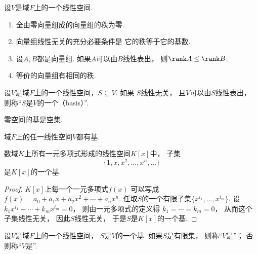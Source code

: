 \begin{property}
设\(V\)是域\(F\)上的一个线性空间.
\begin{enumerate}
	\item 全由零向量组成的向量组的秩为零.

	\item 向量组线性无关的充分必要条件是
	它的秩等于它的基数.

	\item 设\(A,B\)都是向量组.
	如果\(A\)可以由\(B\)线性表出，
	则\(\rank A \leq \rank B\).

	\item 等价的向量组有相同的秩.
\end{enumerate}
\end{property}

\begin{definition}
设\(V\)是域\(F\)上的一个线性空间，\(S \subseteq V\).
如果
\(S\)线性无关，
且\(V\)可以由\(S\)线性表出，
则称“\(S\)是\(V\)的一个（basis）”.
\end{definition}

\begin{property}
零空间的基是空集.
\end{property}

\begin{property}
域\(F\)上的任一线性空间\(V\)都有基.
\end{property}

\begin{example}
数域\(K\)上所有一元多项式形成的线性空间\(K[x]\)中，
子集\[
	\{1,x,x^2,\dotsc,x^n,\dotsc\}
\]是\(K[x]\)的一个基.
\begin{proof}
\(K[x]\)上每一个一元多项式\(f(x)\)
可以写成\(f(x)=a_0+a_1 x+a_2 x^2+\dotsb+a_n x^n\).
任取\(S\)的一个有限子集\(\{x^{i_1},\dotsc,x^{i_m}\}\).
设\(k_1 x^{i_1}+\dotsb+k_m x^{i_m}=0\)，
则由一元多项式的定义得
\(k_1=\dotsb=k_m=0\)，
从而这个子集线性无关，
因此\(S\)线性无关，
于是\(S\)是\(K[x]\)的一个基.
\end{proof}
\end{example}

\begin{definition}
设\(V\)是域\(F\)上的一个线性空间，
\(S\)是\(V\)的一个基.
如果\(S\)是有限集，
则称“\(V\)是”；
否则称“\(V\)是”.
\end{definition}

